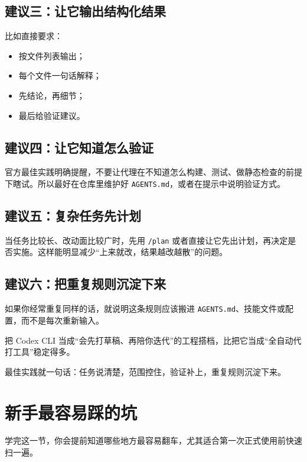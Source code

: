 \documentclass[UTF8,a4paper,12pt]{ctexart}
\begin{document}
\subsection{建议三：让它输出结构化结果}

比如直接要求：
\begin{itemize}
  \item 按文件列表输出；
  \item 每个文件一句话解释；
  \item 先结论，再细节；
  \item 最后给验证建议。
\end{itemize}

\subsection{建议四：让它知道怎么验证}

官方最佳实践明确提醒，不要让代理在不知道怎么构建、测试、做静态检查的前提下瞎试。所以最好在仓库里维护好 \texttt{AGENTS.md}，或者在提示中说明验证方式。

\subsection{建议五：复杂任务先计划}

当任务比较长、改动面比较广时，先用 \texttt{/plan} 或者直接让它先出计划，再决定是否实施。这样能明显减少“上来就改，结果越改越散”的问题。

\subsection{建议六：把重复规则沉淀下来}

如果你经常重复同样的话，就说明这条规则应该搬进 \texttt{AGENTS.md}、技能文件或配置，而不是每次重新输入。

\begin{tipbox}
把 Codex CLI 当成“会先打草稿、再陪你迭代”的工程搭档，比把它当成“全自动代打工具”稳定得多。
\end{tipbox}

\begin{sumbox}
最佳实践就一句话：任务说清楚，范围控住，验证补上，重复规则沉淀下来。
\end{sumbox}

\section{新手最容易踩的坑}

\begin{learnbox}
学完这一节，你会提前知道哪些地方最容易翻车，尤其适合第一次正式使用前快速扫一遍。
\end{learnbox}
\end{document}
